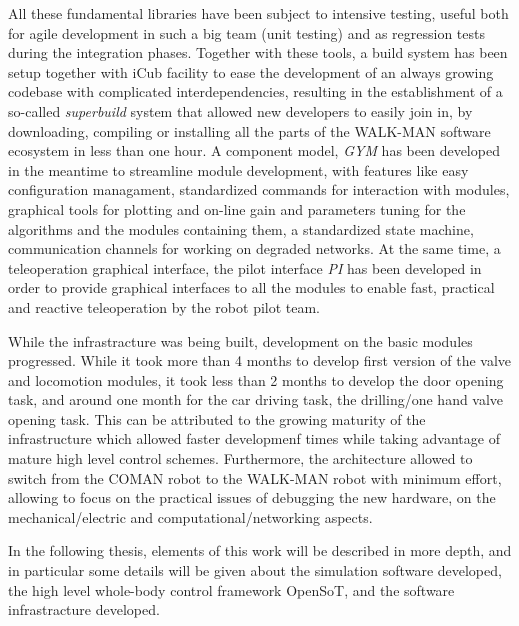 \documentclass[%
	paper=A4,					%
	twoside=true,				%
	openright,			.
	parskip=full,				%
	chapterprefix=true,			%
	11pt,						%
	headings=normal,			%
	bibliography=totoc,			%
	listof=totoc,				%
	titlepage=on,				%
	captions=tableabove,		%
	draft=false,				%
]{scrreprt}%
\begin{document}
All these fundamental libraries have been subject to intensive testing, useful both for agile development in such a big team (unit testing) and as regression tests during the integration phases. Together with these tools, a build system has been setup together with iCub facility to ease the development of an always growing codebase with complicated interdependencies, resulting in the establishment of a so-called \emph{superbuild} system that allowed new developers to easily join in, by downloading, compiling or installing all the parts of the WALK-MAN software ecosystem in less than one hour. A component model, \emph{GYM} has been developed in the meantime to streamline module development, with features like easy configuration managament, standardized commands for interaction with modules, graphical tools for plotting and on-line gain and parameters tuning for the algorithms and the modules containing them, a standardized state machine, communication channels for working on degraded networks. At the same time, a teleoperation graphical interface, the pilot interface \emph{PI} has been developed in order to provide graphical interfaces to all the modules to enable fast, practical and reactive teleoperation by the robot pilot team.

While the infrastracture was being built, development on the basic modules progressed. While it took more than 4 months to develop first version of the valve and locomotion modules, it took less than 2 months to develop the door opening task, and around one month for the car driving task, the drilling/one hand valve opening task. This can be attributed to the growing maturity of the infrastructure which allowed faster developmenf times while taking advantage of mature high level control schemes. Furthermore, the architecture allowed to switch from the COMAN robot to the WALK-MAN robot with minimum effort, allowing to focus on the practical issues of debugging the new hardware, on the mechanical/electric and computational/networking aspects.

In the following thesis, elements of this work will be described in more depth, and in particular some details will be given about the simulation software developed, the high level whole-body control framework OpenSoT, and the software infrastracture developed.
\end{document}
